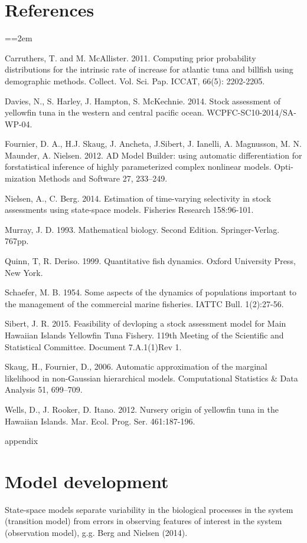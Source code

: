 \documentclass[12pt,letterpaper,twoside]{article}
\newcommand\doublespacing{\baselineskip=1.6\normalbaselineskip}
\begin{document}
\section*{References}
{\parindent=0cm \small
\everypar={\hangindent=2em }\par
Carruthers, T. and M. McAllister. 2011.
Computing prior probability distributions for the
intrinsic rate of increase for atlantic tuna and
billfish using demographic methods.
Collect. Vol. Sci. Pap. ICCAT, 66(5): 2202-2205.

Davies, N., S. Harley, J. Hampton, S. McKechnie. 2014. Stock
assessment of yellowfin tuna in the western and central pacific ocean.
WCPFC-SC10-2014/SA-WP-04.

Fournier, D. A., H.J. Skaug, J. Ancheta, J.Sibert, J. Ianelli, 
A. Magnusson, M. N. Maunder, A. Nielsen. 2012. AD Model Builder:
using automatic differentiation for forstatistical inference of highly
parameterized complex nonlinear models. Opti-mization Methods and
Software 27, 233–249.

Nielsen, A., C. Berg. 2014. Estimation of time-varying selectivity
in stock assessments using state-space models. Fisheries Research
158:96-101.

Murray, J. D. 1993. Mathematical biology. Second Edition.
Springer-Verlag. 767pp.

Quinn, T, R. Deriso. 1999. Quantitative fish dynamics. Oxford
University Press, New York.

Schaefer, M. B. 1954. Some aspects of the dynamics of populations
important to the management of the commercial marine fisheries. IATTC
Bull. 1(2):27-56.

Sibert, J. R. 2015. Feasibility of devloping a stock assessment
model for Main Hawaiian Islands Yellowfin Tuna Fishery.
119th Meeting of the Scientific and Statistical Committee.
Document 7.A.1(1)Rev 1.

Skaug, H., Fournier, D., 2006. Automatic approximation of the marginal
likelihood in non-Gaussian hierarchical models. Computational
Statistics \& Data Analysis 51, 699–709.

Wells, D., J. Rooker, D. Itano. 2012.  Nursery origin of yellowfin
tuna in the Hawaiian Islands. Mar. Ecol. Prog. Ser. 461:187-196. 
\par}

\clearpage

appendix
\section{Model development}
\label{sec:models}
State-space models separate variability in the biological
processes in the system (transition model)
from errors in observing features of interest
in the system (observation model), g.g. Berg and Nielsen (2014). 
\end{document}

